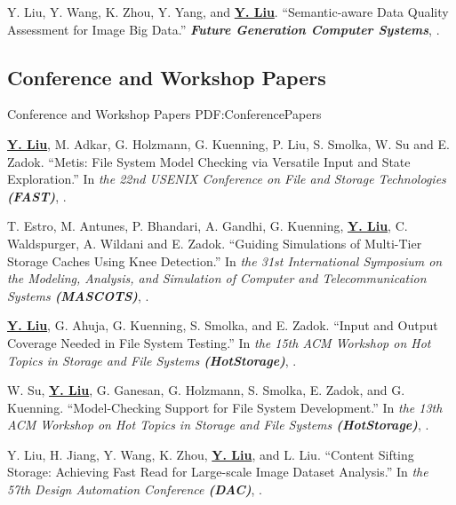 \documentclass[a4paper,10pt,oneside]{article}
\begin{document}
\begin{body}
\NumberedItem{[3]}
Y. Liu, Y. Wang, K. Zhou, Y. Yang, and \textbf{\underline{Y. Liu}}.
``Semantic-aware Data Quality Assessment for Image Big Data.'' 
\textit{\textbf{Future Generation Computer Systems}},
.

\subsection
{Conference and Workshop Papers}
{Conference and Workshop Papers}
{PDF:ConferencePapers}

\NumberedItem{[1]}
\textbf{\underline{Y. Liu}}, M. Adkar, G. Holzmann, G. Kuenning, P. Liu, S. Smolka, W. Su and E. Zadok.
``Metis: File System Model Checking via Versatile Input and State Exploration.''
In \textit{the 22nd USENIX Conference on File and Storage Technologies
\textbf{(FAST)}}, %
. 

\NumberedItem{[2]}
T. Estro, M. Antunes, P. Bhandari, A. Gandhi, G. Kuenning, \textbf{\underline{Y. Liu}}, C. Waldspurger, A. Wildani and E. Zadok.
``Guiding Simulations of Multi-Tier Storage Caches Using Knee Detection.''
In \textit{the 31st International Symposium on the Modeling, Analysis, and Simulation of Computer and Telecommunication Systems \textbf{(MASCOTS)}}, %
. 

\Gap

\NumberedItem{[3]}
\textbf{\underline{Y. Liu}}, G. Ahuja, G. Kuenning, S. Smolka, and E. Zadok.
``Input and Output Coverage Needed in File System Testing.''
In \textit{the 15th ACM Workshop on Hot Topics in Storage and File Systems \textbf{(HotStorage)}}, %
.


\NumberedItem{[4]}
W. Su, \textbf{\underline{Y. Liu}}, G. Ganesan, G. Holzmann, S. Smolka, E. Zadok, and G. Kuenning.
``Model-Checking Support for File System Development.''
In \textit{the 13th ACM Workshop on Hot Topics in Storage and File Systems \textbf{(HotStorage)}}, %
.


\NumberedItem{[5]}
Y. Liu, H. Jiang, Y. Wang, K. Zhou, \textbf{\underline{Y. Liu}}, and L. Liu.
``Content Sifting Storage: Achieving Fast Read for Large-scale Image Dataset Analysis.''
In \textit{the 57th Design Automation Conference \textbf{(DAC)}}, %
.


\end{body}
\end{document}
